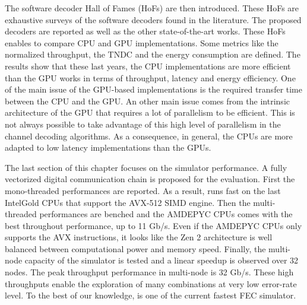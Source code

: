 The software decoder Hall of Fames (HoFs) are then introduced. These HoFs are
exhaustive surveys of the software decoders found in the literature. The
proposed decoders are reported as well as the other state-of-the-art works.
These HoFs enables to compare CPU and GPU implementations. Some metrics like the
normalized throughput, the TNDC and the energy consumption are defined. The
results show that these last years, the CPU implementations are more efficient
than the GPU works in terms of throughput, latency and energy efficiency. One of
the main issue of the GPU-based implementations is the required transfer time
between the CPU and the GPU. An other main issue comes from the intrinsic
architecture of the GPU that requires a lot of parallelism to be efficient. This
is not always possible to take advantage of this high level of parallelism in
the channel decoding algorithms. As a consequence, in general, the CPUs are more
adapted to low latency implementations than the GPUs.

The last section of this chapter focuses on the \AFFECT simulator performance.
A fully vectorized digital communication chain is proposed for the evaluation.
First the mono-threaded performances are reported. As a result, \AFFECT runs
fast on the last Intel\R Gold CPUs that support the AVX-512 SIMD engine.
Then the multi-threaded performances are benched and the AMD\R EPYC CPUs comes
with the best throughout performance, up to 11 Gb/s. Even if the AMD\R EPYC CPUs
only supports the AVX instructions, it looks like the Zen 2 architecture is well
balanced between computational power and memory speed. Finally, the multi-node
capacity of the \AFFECT simulator is tested and a linear speedup is observed
over 32 nodes. The peak throughput performance in multi-node is 32 Gb/s. These
high throughputs enable the exploration of many combinations at very low
error-rate level. To the best of our knowledge, \AFFECT is one of the current
fastest FEC simulator.
